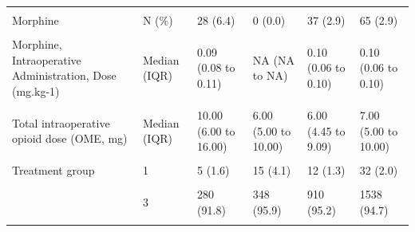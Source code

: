 \documentclass[
  letterpaper,
  DIV=11,
  numbers=noendperiod]{scrreprt}
\begin{document}
\begin{stbl}
{\begin{table}
\begin{tabular*}{\linewidth}{@{\extracolsep{\fill}}llllll}
{\cellcolor[HTML]{F2F2F2}{Fentanyl, Intraoperative Administration, Dose (µg.kg-1)}} & {\cellcolor[HTML]{F2F2F2}{Median (IQR)}} & {\cellcolor[HTML]{F2F2F2}{1.30 (1.00 to 1.86)}} & {\cellcolor[HTML]{F2F2F2}{1.01 (0.94 to 1.56)}} & {\cellcolor[HTML]{F2F2F2}{1.20 (1.00 to 1.91)}} & {\cellcolor[HTML]{F2F2F2}{1.14 (0.99 to 1.85)}} \\ 
{Morphine} & {N (\%)} & {28 (6.4)} & {0 (0.0)} & {37 (2.9)} & {65 (2.9)} \\ 
{\cellcolor[HTML]{F2F2F2}{Morphine, Intraoperative Administration, Dose (mg)}} & {\cellcolor[HTML]{F2F2F2}{Median (IQR)}} & {\cellcolor[HTML]{F2F2F2}{5.00 (3.00 to 7.75)}} & {\cellcolor[HTML]{F2F2F2}{NA (NA to NA)}} & {\cellcolor[HTML]{F2F2F2}{1.80 (1.40 to 3.00)}} & {\cellcolor[HTML]{F2F2F2}{2.50 (1.50 to 5.00)}} \\ 
{Morphine, Intraoperative Administration, Dose (mg.kg-1)} & {Median (IQR)} & {0.09 (0.08 to 0.11)} & {NA (NA to NA)} & {0.10 (0.06 to 0.10)} & {0.10 (0.06 to 0.10)} \\ 
{\cellcolor[HTML]{F2F2F2}{Intra-operative opioids given}} & {\cellcolor[HTML]{F2F2F2}{N (\%)}} & {\cellcolor[HTML]{F2F2F2}{432 (98.6)}} & {\cellcolor[HTML]{F2F2F2}{511 (96.6)}} & {\cellcolor[HTML]{F2F2F2}{1278 (98.9)}} & {\cellcolor[HTML]{F2F2F2}{2221 (98.3)}} \\ 
{Total intraoperative opioid dose  (OME, mg)} & {Median (IQR)} & {10.00 (6.00 to 16.00)} & {6.00 (5.00 to 10.00)} & {6.00 (4.45 to 9.09)} & {7.00 (5.00 to 10.00)} \\ 
{\cellcolor[HTML]{F2F2F2}{Total intraoperative opioid dose  (OME, mg.kg-1)}} & {\cellcolor[HTML]{F2F2F2}{Median (IQR)}} & {\cellcolor[HTML]{F2F2F2}{0.28 (0.20 to 0.39)}} & {\cellcolor[HTML]{F2F2F2}{0.20 (0.19 to 0.31)}} & {\cellcolor[HTML]{F2F2F2}{0.25 (0.20 to 0.39)}} & {\cellcolor[HTML]{F2F2F2}{0.24 (0.20 to 0.38)}} \\ 
{Treatment group} & {1} & {5 (1.6)} & {15 (4.1)} & {12 (1.3)} & {32 (2.0)} \\ 
{\cellcolor[HTML]{F2F2F2}{}} & {\cellcolor[HTML]{F2F2F2}{2}} & {\cellcolor[HTML]{F2F2F2}{2 (0.7)}} & {\cellcolor[HTML]{F2F2F2}{0 (0.0)}} & {\cellcolor[HTML]{F2F2F2}{0 (0.0)}} & {\cellcolor[HTML]{F2F2F2}{2 (0.1)}} \\ 
 & 3 & {280 (91.8)} & 348 (95.9) & 910 (95.2) & 1538 (94.7) \\ 
{\cellcolor[HTML]{F2F2F2}{}} & {\cellcolor[HTML]{F2F2F2}{4}} & {\cellcolor[HTML]{F2F2F2}{18 (5.9)}} & {\cellcolor[HTML]{F2F2F2}{0 (0.0)}} & {\cellcolor[HTML]{F2F2F2}{34 (3.6)}} & {\cellcolor[HTML]{F2F2F2}{52 (3.2)}} \\ 
\bottomrule
\end{tabular*}
\end{table}

}

\caption{\label{stbl-analgesic-paed}\textbf{Anaesthetic management -
Paediatrics.} Intraoperative analgesia administration for paediatric
patients stratified by surgical group. OME, Oral Morphine Equivalent.
Weight based dosed calculated where patient weight available.}

\end{stbl}%
\end{document}
